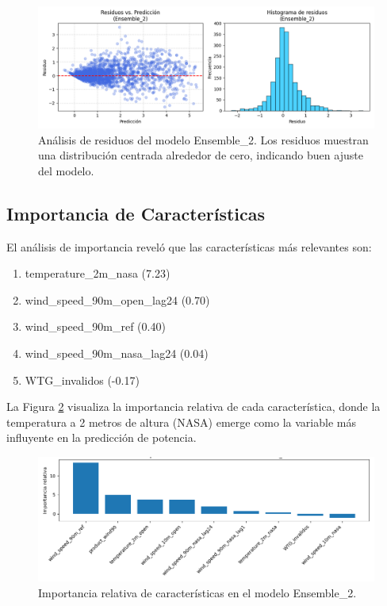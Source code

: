 \documentclass[conference]{IEEEtran}
\begin{document}
	\begin{figure}[htbp]
		\centering
		\includegraphics[width=0.9\linewidth]{images/Figure_3.png}
		\caption{Análisis de residuos del modelo Ensemble\_2. Los residuos muestran una distribución centrada alrededor de cero, indicando buen ajuste del modelo.}
		\label{fig:residuos_mejor_modelo}
	\end{figure}
	
	\subsection{Importancia de Características}
	El análisis de importancia reveló que las características más relevantes son:
	\begin{enumerate}
		\item temperature\_2m\_nasa (7.23)
		\item wind\_speed\_90m\_open\_lag24 (0.70)
		\item wind\_speed\_90m\_ref (0.40)
		\item wind\_speed\_90m\_nasa\_lag24 (0.04)
		\item WTG\_invalidos (-0.17)
	\end{enumerate}
	
	La Figura \ref{fig:importancia_caracteristicas} visualiza la importancia relativa de cada característica, donde la temperatura a 2 metros de altura (NASA) emerge como la variable más influyente en la predicción de potencia.
	
	\begin{figure}[htbp]
		\centering
		\includegraphics[width=0.9\linewidth]{images/Figure_6.png}
		\caption{Importancia relativa de características en el modelo Ensemble\_2. }
		\label{fig:importancia_caracteristicas}
	\end{figure}
	
\end{document}
